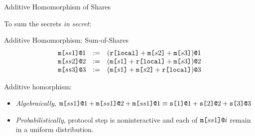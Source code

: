 \documentclass{beamer}
\begin{document}
\begin{frame}{Additive Homomorphism of Shares}

  To sum the secrets \emph{in secret}:
  
  \begin{block}{Additive Homomorphism: Sum-of-Shares}
    $$
    \begin{array}{lll}
      \texttt{m[}ss1\texttt{]}\texttt{@}1 &:=& (\texttt{r[}\mathtt{local}\texttt{]} + \texttt{m[}s2\texttt{]} + \texttt{m[}s3\texttt{]})\texttt{@}1 \\ 
      \texttt{m[}ss2\texttt{]}\texttt{@}2 &:=& (\texttt{m[}s1\texttt{]} + \texttt{r[}\mathtt{local}\texttt{]} + \texttt{m[}s3\texttt{]})\texttt{@}2 \\
      \texttt{m[}ss3\texttt{]}\texttt{@}3 &:=& (\texttt{m[}s1\texttt{]} + \texttt{m[}s2\texttt{]} + \texttt{r[}\mathtt{local}\texttt{]})\texttt{@}3 
    \end{array}
    $$
  \end{block}

  Additive homorphism:
  \begin{itemize}
  \item \emph{Algebraically}, $\texttt{m[}ss1\texttt{]}\texttt{@}1 + \texttt{m[}ss1\texttt{]}\texttt{@}2 + \texttt{m[}ss1\texttt{]}\texttt{@}1 \equiv \texttt{s[}1\texttt{]}\texttt{@}1 + \texttt{s[}2\texttt{]}\texttt{@}2 + \texttt{s[}3\texttt{]}\texttt{@}3$ 
  \item \emph{Probabilistically}, protocol step is noninteractive and each of $\texttt{m[}ss1\texttt{]}\texttt{@}i$ remain in a uniform distribution.
  \end{itemize}
  
\end{frame}

\begin{comment}
\begin{frame}{Example contd.: Output}

  \begin{itemize}
    \item Any $\mx{ss1}{*},\mx{ss2}{*},\mx{ss3}{*}$ such that:
    $$
    \mx{ss1}{*} + \ \mx{ss2}{*} + \ \mx{ss3}{*} \eop \sx{1}{1} + \sx{2}{2}  + \sx{3}{3}
    $$
    are \cemph{equally likely}.
  \end{itemize}

  \begin{block}{Client Outputs}
    $$
    \begin{array}{lll}
      \out{1} &:=& \elab{(\mesg{ss1} \fplus \mesg{ss2} + \mesg{ss3})}{1}\\
      \out{2} &:=& \elab{(\mesg{ss1} \fplus \mesg{ss2} + \mesg{ss3})}{2}\\
      \out{3} &:=& \elab{(\mesg{ss1} \fplus \mesg{ss2} + \mesg{ss3})}{3}
    \end{array}
    $$
  \end{block}
  
  
\end{frame}
\end{comment}
\end{document}
